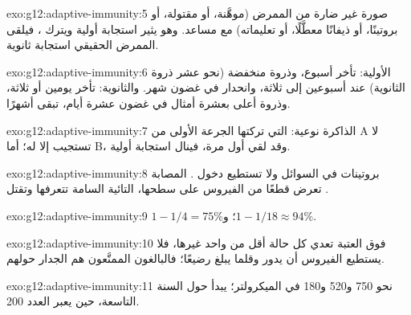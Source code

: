 \begin{solution}{exo:g12:adaptive-immunity:5}
صورة غير ضارة من  الممرض (موهَّنة، أو مقتولة، أو بروتينًا، أو
ذيفانًا معطَّلًا، أو تعليماته) مع مساعد. وهو يثير استجابة أولية ويترك
، فيلقى الممرض الحقيقي استجابة ثانوية.
\end{solution}

\begin{solution}{exo:g12:adaptive-immunity:6}
الأولية: تأخر أسبوع، وذروة منخفضة (نحو عشر ذروة الثانوية) عند أسبوعين
إلى ثلاثة، وانحدار في غضون شهر. والثانوية: تأخر يومين أو ثلاثة، وذروة
أعلى بعشرة أمثال في غضون عشرة أيام، تبقى أشهرًا.
\end{solution}

\begin{solution}{exo:g12:adaptive-immunity:7}
الذاكرة نوعية:  التي تركتها الجرعة الأولى من  A
لا تستجيب إلا له؛ أما B، وقد لقي أول مرة، فينال استجابة أولية.
\end{solution}

\begin{solution}{exo:g12:adaptive-immunity:8}
 بروتينات في السوائل ولا تستطيع دخول . 
المصابة تعرض قطعًا من الفيروس على سطحها،  التائية السامة
تتعرفها وتقتل .
\end{solution}

\begin{solution}{exo:g12:adaptive-immunity:9}
$1 - 1/4 = 75\%$؛ و$1 - 1/18 \approx 94\%$.
\end{solution}

\begin{solution}{exo:g12:adaptive-immunity:10}
فوق العتبة تعدي كل حالة أقل من واحد غيرها، فلا يستطيع الفيروس أن يدور
وقلما يبلغ رضيعًا؛ فالبالغون الممنَّعون هم الجدار حولهم.
\end{solution}

\begin{solution}{exo:g12:adaptive-immunity:11}
نحو 750 و520 و180 في الميكرولتر؛  يبدأ حول السنة التاسعة، حين
يعبر العدد 200.
\end{solution}

